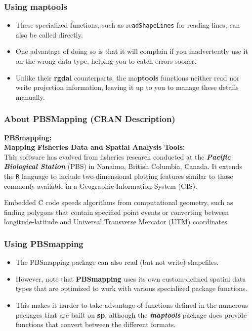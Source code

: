 \documentclass{beamer}
\begin{document}
\begin{frame}
\frametitle{Using maptools}
\begin{itemize}
\item These specialized functions, such as re\texttt{adShapeLines} for reading lines, can also be called directly. 
\item 
One advantage of doing so is that it will complain if you inadvertently use it on the wrong data type, helping you to catch errors sooner. \item Unlike their \textbf{rgdal} counterparts, the ma\textbf{ptools} functions neither read nor write projection information, leaving it up to you to manage these details manually.
\end{itemize}
\end{frame}

\begin{frame}
\frametitle{About PBSMapping (CRAN Description)}
\textbf{PBSmapping:\\ Mapping Fisheries Data and Spatial Analysis Tools:}\\

This software has evolved from fisheries research conducted at the \emph{\textbf{Pacific Biological Station}} (PBS) in Nanaimo, British Columbia, Canada. It extends the \texttt{R} language to include two-dimensional plotting features similar to those commonly available in a Geographic Information System (GIS). 

Embedded C code speeds algorithms from computational geometry, such as finding polygons that contain specified point events or converting between longitude-latitude and Universal Transverse Mercator (UTM) coordinates.
\end{frame}
\begin{frame}
\frametitle{Using PBSmapping}
\begin{itemize}
\item The PBSmapping package can also read (but not write) shapefiles. 
\item However, note that \textbf{PBSmapping} uses its own custom-defined spatial data types that are optimized to work with various 
specialized package functions. \item  This makes it harder to take advantage of functions defined in the numerous packages 
that are built on \textbf{sp}, although the \textbf{\textit{maptools}} package does provide functions that convert between the different formats.
\end{itemize}
\end{frame}
\end{document}
